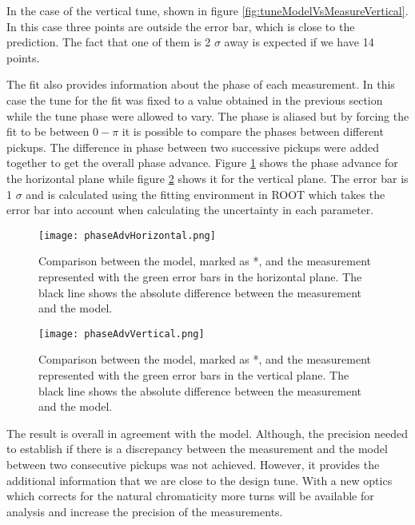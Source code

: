 In the case of the vertical tune, shown in figure \ref{fig:tuneModelVsMeasureVertical}. 
In this case three points are outside the error bar, which is close to the prediction. 
The fact that one of them is 2 $\sigma$ away is expected if we have 14 points.


The fit also provides information about the phase of each measurement. 
In this case the tune for the fit was fixed to a value obtained in the previous section 
while the tune phase were allowed to vary. 
The phase is aliased but by forcing the fit to be between $0 - \pi$ 
it is possible to compare the phases between different pickups. 
The difference in phase between two successive pickups were added together 
to get the overall phase advance. 
Figure \ref{fig:phaseAdvHorizontal} shows the phase advance for 
the horizontal plane while figure \ref{fig:phaseAdvVertical} shows it 
for the vertical plane. The error bar is 1 $\sigma$ and 
is calculated using the fitting environment in ROOT which takes the error bar into account
when calculating the uncertainty in each parameter.
 
\begin{figure}[!h]
\centering
\texttt{[image: phaseAdvHorizontal.png]}
\caption[Phase advance in the horizontal plane]
{Comparison between the model, marked as *, 
and the measurement represented with the green error bars in the horizontal plane. 
The black line shows the absolute difference between the measurement 
and the model. \label{fig:phaseAdvHorizontal}}
\end{figure}
 
\begin{figure}[!h]
\centering
\texttt{[image: phaseAdvVertical.png]}
\caption[Phase advance in the vertical plane]{Comparison between the model, 
marked as *, and the measurement represented with the green error bars 
in the vertical plane. 
The black line shows the absolute difference between the measurement and 
the model.\label{fig:phaseAdvVertical}}
\end{figure}
 
The result is overall in agreement with the model. 
Although, the precision needed to establish if there is a discrepancy 
between the measurement and the model between two consecutive pickups was not achieved. 
However, it provides the additional information that we are close to the design tune. 
With a new optics which corrects for the natural chromaticity more turns will be available
for analysis and increase the precision of the measurements.
 
